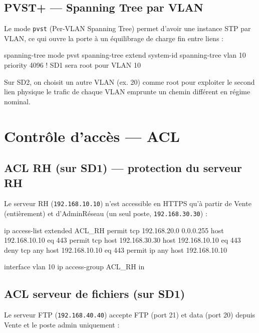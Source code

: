 \documentclass[11pt,a4paper]{article}
\begin{document}
\subsection{PVST+ — Spanning Tree par VLAN}

Le mode \texttt{pvst} (Per-VLAN Spanning Tree) permet d'avoir une instance STP par VLAN, ce qui ouvre la porte à un équilibrage de charge fin entre liens :

\begin{ciscobox}
spanning-tree mode pvst
spanning-tree extend system-id
spanning-tree vlan 10 priority 4096    ! SD1 sera root pour VLAN 10
\end{ciscobox}

Sur SD2, on choisit un autre VLAN (ex. 20) comme root pour exploiter le second lien physique \textemdash{} le trafic de chaque VLAN emprunte un chemin différent en régime nominal.

\section{Contrôle d'accès — ACL}

\subsection{ACL RH (sur SD1) — protection du serveur RH}

Le serveur RH (\texttt{192.168.10.10}) n'est accessible en HTTPS qu'à partir de Vente (entièrement) et d'AdminRéseau (un seul poste, \texttt{192.168.30.30}) :

\begin{ciscobox}
ip access-list extended ACL_RH
 permit tcp 192.168.20.0 0.0.0.255 host 192.168.10.10 eq 443
 permit tcp host 192.168.30.30      host 192.168.10.10 eq 443
 deny   tcp any                     host 192.168.10.10 eq 443
 permit ip  any                     host 192.168.10.10

interface vlan 10
 ip access-group ACL_RH in
\end{ciscobox}

\subsection{ACL serveur de fichiers (sur SD1)}

Le serveur FTP (\texttt{192.168.40.40}) accepte FTP (port 21) et data (port 20) depuis Vente et le poste admin uniquement :
\end{document}
